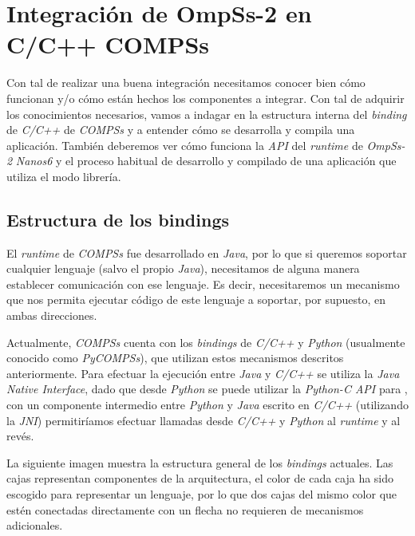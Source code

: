 

\section{Integración de OmpSs-2 en C/C++ COMPSs}

Con tal de realizar una buena integración necesitamos conocer bien cómo funcionan y/o cómo están hechos los componentes a integrar. Con tal de adquirir los conocimientos necesarios, vamos a indagar en la estructura interna del \textit{binding} de \textit{C/C++} de \textit{COMPSs} y a entender cómo se desarrolla y compila una aplicación. También deberemos ver cómo funciona la \textit{API} del \textit{runtime} de \textit{OmpSs-2} \textit{Nanos6} y el proceso habitual de desarrollo y compilado de una aplicación que utiliza el modo librería.

\subsection{Estructura de los bindings}

El \textit{runtime} de \textit{COMPSs} fue desarrollado en \textit{Java}, por lo que si queremos soportar cualquier lenguaje (salvo el propio \textit{Java}), necesitamos de alguna manera establecer comunicación con ese lenguaje. Es decir, necesitaremos un mecanismo que nos permita ejecutar código de este lenguaje a soportar, por supuesto, en ambas direcciones. 
\par\bigskip
Actualmente, \textit{COMPSs} cuenta con los \textit{bindings} de \textit{C/C++} y \textit{Python} (usualmente conocido como \textit{PyCOMPSs}), que utilizan estos mecanismos descritos anteriormente. Para efectuar la ejecución entre \textit{Java} y \textit{C/C++} se utiliza la \textit{Java Native Interface}, dado que desde \textit{Python} se puede utilizar la \textit{Python-C API} para , con un componente intermedio entre \textit{Python} y \textit{Java} escrito en \textit{C/C++} (utilizando la \textit{JNI}) permitiríamos efectuar llamadas desde \textit{C/C++} y \textit{Python} al \textit{runtime} y al revés. 
\par\bigskip
La siguiente imagen muestra la estructura general de los \textit{bindings} actuales. Las cajas representan componentes de la arquitectura, el color de cada caja ha sido escogido para representar un lenguaje, por lo que dos cajas del mismo color que estén conectadas directamente con un flecha no requieren de mecanismos adicionales.

